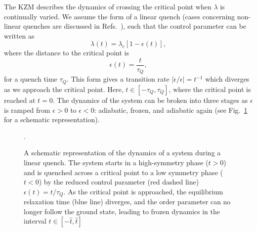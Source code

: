 The KZM describes the dynamics of crossing the critical point when \( \lambda \)
is continually varied.
We assume the form of a linear quench (cases concerning non-linear quenches are
discussed in Refs.~\cite{Barankov2008,Mondal2009}), such that the control
parameter can be written as
\begin{equation}
    \lambda(t) = \lambda_c\left[1 - \epsilon(t)\right],
\end{equation}
where the distance to the critical point is
\begin{equation}
    \epsilon(t) = \frac{t}{\tau_Q},
    \label{eq: time-dependent-epsilon}
\end{equation}
for a quench time \( \tau_Q \).
This form gives a transition rate \( |\dot{\epsilon}/{\epsilon}|=t^{-1} \) which
diverges as we approach the critical point.
Here, \( t \in [-\tau_Q, \tau_Q] \), where the critical point is reached at
\( t=0 \).
The dynamics of the system can be broken into three stages as \( \epsilon \) is
ramped from \( \epsilon > 0 \) to \( \epsilon < 0 \): adiabatic, frozen, and
adiabatic again (see Fig.~\ref{fig: adiabatic-impulse} for a schematic
representation).
\begin{figure}
    \centering
    \caption[Schematic representation of the dynamics of a system during a
        linear quench]
    {A schematic representation of the dynamics of a system during a
    linear quench. The system starts in a high-symmetry phase (\( t > 0 \)) and
    is quenched across a critical point to a low symmetry phase (\( t < 0 \)) by
    the reduced control parameter (red dashed line) \( \epsilon(t) = t/\tau_Q\).
    As the critical point is approached, the equilibrium relaxation time
    (blue line) diverges, and the order parameter can no longer follow the
    ground state, leading to frozen dynamics in the interval
    \( t \in [-\hat{t}, \hat{t}] \)}.\label{fig: adiabatic-impulse}
\end{figure}

